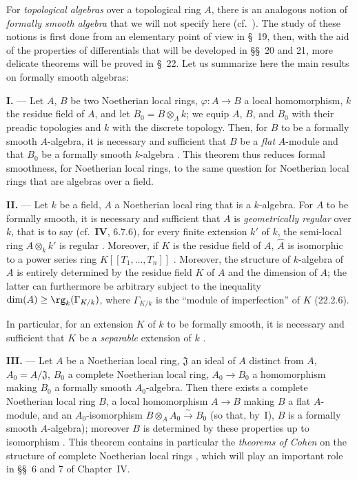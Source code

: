 \begin{env}[19.0.2]
\label{0.19.0.2}
For \emph{topological algebras} over a topological ring $A$, there is an analogous notion of \emph{formally smooth algebra} that we will not specify here (cf.~).
The study of these notions is first done from an elementary point of view in \S~19, then, with the aid of the properties of differentials that will be developed in \S\S~20 and 21, more delicate theorems will be proved in \S~22.
Let us summarize here the main results on formally smooth algebras:

\medskip\noindent\textbf{I.} ---
Let $A$, $B$ be two Noetherian local rings, $\varphi:A\to B$ a local homomorphism, $k$ the residue field of $A$, and let $B_0=B\otimes_A k$;
we equip $A$, $B$, and $B_0$ with their preadic topologies and $k$ with the discrete topology.
Then, for $B$ to be a formally smooth $A$-algebra, it is necessary and sufficient that $B$ be a \emph{flat} $A$-module and that $B_0$ be a formally smooth $k$-algebra .
This theorem thus reduces formal smoothness, for Noetherian local rings, to the same question for Noetherian local rings that are algebras over a field.

\medskip\noindent\textbf{II.} ---
Let $k$ be a field, $A$ a Noetherian local ring that is a $k$-algebra.
For $A$ to be formally smooth, it is necessary and sufficient that $A$ is \emph{geometrically regular} over $k$, that is to say (cf.~$\mathbf{IV}$, 6.7.6), for every finite extension $k'$ of $k$, the semi-local ring $A\otimes_k k'$ is regular .
Moreover, if $K$ is the residue field of $A$, $\widehat{A}$ is isomorphic to a power series ring $K[[T_1,\ldots,T_n]]$ .
Moreover, the structure of $k$-algebra of $A$ is entirely determined by the residue field $K$ of $A$ and the dimension of $A$;
the latter can furthermore be arbitrary subject to the inequality $\dim(A)\geq\rg_k(\Gamma_{K/k})$, where $\Gamma_{K/k}$ is the ``module of imperfection'' of $K$ (22.2.6).

In particular, for an extension $K$ of $k$ to be formally smooth, it is necessary and sufficient that $K$ be a \emph{separable} extension of $k$ .

\medskip\noindent\textbf{III.} ---
Let $A$ be a Noetherian local ring, $\mathfrak{J}$ an ideal of $A$ distinct from $A$, $A_0=A/\mathfrak{J}$, $B_0$ a complete Noetherian local ring, $A_0\to B_0$ a homomorphism making $B_0$ a formally smooth $A_0$-algebra.
Then there exists a complete Noetherian local ring $B$, a local homomorphism $A\to B$ making $B$ a flat $A$-module, and an $A_0$-isomorphism $B\otimes_A A_0\xrightarrow{\sim}B_0$ (so that, by~I), $B$ is a formally smooth $A$-algebra);
moreover $B$ is determined by these properties up to isomorphism .
This theorem contains in particular the \emph{theorems of Cohen} on the structure of complete Noetherian local rings , which will play an important role in \S\S~6 and 7 of Chapter~IV.


\end{env}

